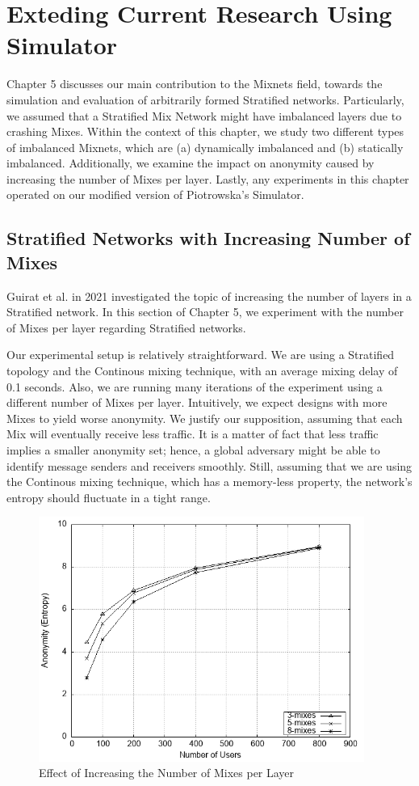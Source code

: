 \documentclass[logo,msc,cyber]{infthesis}   %
\begin{document}
\chapter{Exteding Current Research Using Simulator}
Chapter 5 discusses our main contribution to the Mixnets field, towards the
simulation and evaluation of arbitrarily formed Stratified networks.
Particularly, we assumed that a Stratified Mix Network might have imbalanced
layers due to crashing Mixes. Within the context of this chapter, we study two
different types of imbalanced Mixnets, which are (a) dynamically imbalanced and
(b) statically imbalanced. Additionally, we examine the impact on anonymity
caused by increasing the number of Mixes per layer. Lastly, any experiments in
this chapter operated on our modified version of Piotrowska's
Simulator\cite{simulator}.

\section{Stratified Networks with Increasing Number of Mixes}

Guirat et al.\cite{ben2021mixim} in 2021 investigated the topic of increasing the
number of layers in a Stratified network. In this section of Chapter 5, we
experiment with the number of Mixes per layer regarding Stratified networks.

Our experimental setup is relatively straightforward. We are using a Stratified
topology and the Continous mixing technique, with an average mixing delay of 0.1
seconds. Also, we are running many iterations of the experiment using a
different number of Mixes per layer. Intuitively, we expect designs with more
Mixes to yield worse anonymity. We justify our supposition, assuming that each
Mix will eventually receive less traffic. It is a matter of fact that less
traffic implies a smaller anonymity set; hence, a global adversary might be able
to identify message senders and receivers smoothly. Still, assuming that we are
using the Continous mixing technique, which has a memory-less property, the
network's entropy should fluctuate in a tight range.

\begin{figure}[h!]
    \centering
    \includegraphics[height=8cm]{figures/simulator_extentions/compare_layer_size.png}
    \caption{Effect of Increasing the Number of Mixes per Layer}
    \label{fig:stratified-incresing-number-of-mixes}
\end{figure}    
\end{document}
